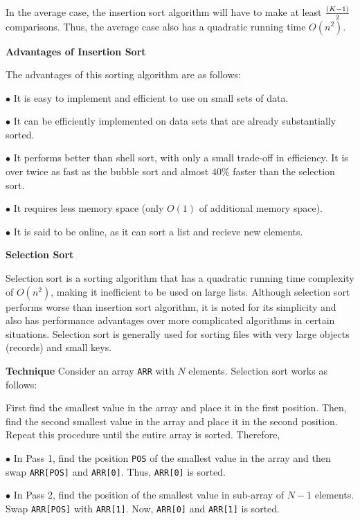 \vskip 1mm
In the average case, the insertion sort algorithm will have to make at least ${(K-1)\over 2}$ comparisons. Thus, the average case also has a quadratic running time $O(n^2)$.

\vskip 3mm
{\bf Advantages  of Insertion Sort}

\vskip 1mm
The advantages of this sorting algorithm are as follows:

\vskip 3mm
\qquad$\bullet$ It is easy to implement and efficient to use on small sets of data.

\vskip 3mm
\qquad$\bullet$ It can be efficiently implemented on data sets that are already substantially sorted.

\vskip 3mm
\qquad$\bullet$ It performs better than shell sort, with only a small trade-off in efficiency. It is over twice as fast as the bubble sort and almost $40\%$ faster than the selection sort.

\vskip 3mm
\qquad$\bullet$ It requires less memory space (only $O(1)$ of additional memory space).

\vskip 3mm
\qquad$\bullet$ It is said to be online, as it can sort a list and recieve new elements.

\filbreak
\vskip 1cm
{\bf Selection Sort}

\vskip 1mm
Selection sort is a sorting algorithm that has a quadratic running time complexity of $O(n^2)$, making it inefficient to be used on large lists. Although selection sort performs worse than insertion sort algorithm, it is noted for its simplicity and also has performance advantages over more complicated algorithms in certain situations. Selection sort is generally used for sorting files with very large objects (records) and small keys.

\vskip 3mm
{\bf Technique}
\vskip 1mm
Consider an array {\tt ARR} with $N$ elements. Selection sort works as follows:

\vskip 1mm
First find the smallest value in the array and place it in the first position. Then, find the second smallest value in the array and place it in the second position. Repeat this procedure until the entire array is sorted. Therefore,

\vskip 3mm
\qquad$\bullet$ In Pass 1, find the position {\tt POS} of the smallest value in the array and then swap {\tt ARR[POS]} and {\tt ARR[0]}. Thus, {\tt ARR[0]} is sorted.

\vskip 3mm
\qquad$\bullet$ In Pass 2, find the position of the smallest value in sub-array of $N-1$ elements. Swap {\tt ARR[POS]} with {\tt ARR[1]}. Now, {\tt ARR[0]} and {\tt ARR[1]} is sorted.

